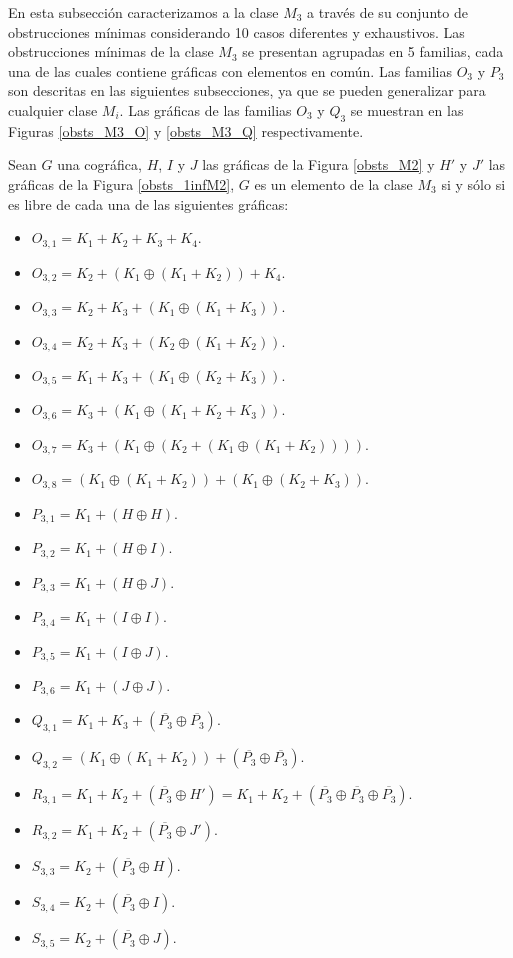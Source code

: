 En esta subsección caracterizamos a la clase $M_3$ a través de su conjunto de obstrucciones mínimas considerando 10 casos diferentes y exhaustivos. Las obstrucciones mínimas de la clase $M_3$ se presentan agrupadas en 5 familias, cada una de las cuales contiene gráficas con elementos en común. Las familias $O_3$ y $P_3$ son descritas en las siguientes subsecciones, ya que se pueden generalizar para cualquier clase $M_i$. Las gráficas de las familias $O_3$ y $Q_3$ se muestran en las Figuras \ref{obsts_M3_O} y \ref{obsts_M3_Q} respectivamente. 


\begin{theorem} \label{teo_obsts_m3}

    Sean $G$ una cográfica, $H$, $I$ y $J$ las gráficas de la Figura \ref{obsts_M2} y $H'$ y $J'$ las gráficas de la Figura \ref{obsts_1infM2}, $G$ es un elemento de la clase $M_3$ si y sólo si es libre de cada una de las siguientes gráficas:
    \begin{itemize}
        \item $O_{3,1}=K_1+K_2+K_3+K_4$.
        \item $O_{3,2}=K_2+(K_1\oplus(K_1+K_2))+K_4$.
        \item $O_{3,3}=K_2+K_3+(K_1\oplus(K_1+K_3))$.
        \item $O_{3,4}=K_2+K_3+(K_2\oplus(K_1+K_2))$.
        \item $O_{3,5}=K_1+K_3+(K_1\oplus(K_2+K_3))$.
        \item $O_{3,6}=K_3+(K_1\oplus(K_1+K_2+K_3))$.
        \item $O_{3,7}=K_3+(K_1\oplus(K_2+(K_1\oplus(K_1+K_2))))$.
        \item $O_{3,8}=(K_1\oplus(K_1+K_2))+(K_1\oplus(K_2+K_3))$.
        \item $P_{3,1}=K_1+(H\oplus H)$.
        \item $P_{3,2}=K_1+(H\oplus I)$.
        \item $P_{3,3}=K_1+(H\oplus J)$.
        \item $P_{3,4}=K_1+(I\oplus I)$.
        \item $P_{3,5}=K_1+(I\oplus J)$.
        \item $P_{3,6}=K_1+(J\oplus J)$.
        \item $Q_{3,1}=K_1+K_3+(\overline{P_3}\oplus\overline{P_3})$.
        \item $Q_{3,2}=(K_1\oplus(K_1+K_2))+(\overline{P_3}\oplus\overline{P_3})$.
        \item $R_{3,1}=K_1+K_2+(\overline{P_3}\oplus H') = K_1+K_2+(\overline{P_3}\oplus\overline{P_3}\oplus\overline{P_3})$.
        \item $R_{3,2}=K_1+K_2+(\overline{P_3}\oplus J')$.
        \item $S_{3,3}=K_2+(\overline{P_3}\oplus H)$.
        \item $S_{3,4}=K_2+(\overline{P_3}\oplus I)$.
        \item $S_{3,5}=K_2+(\overline{P_3}\oplus J)$.
    \end{itemize}

\end{theorem}

